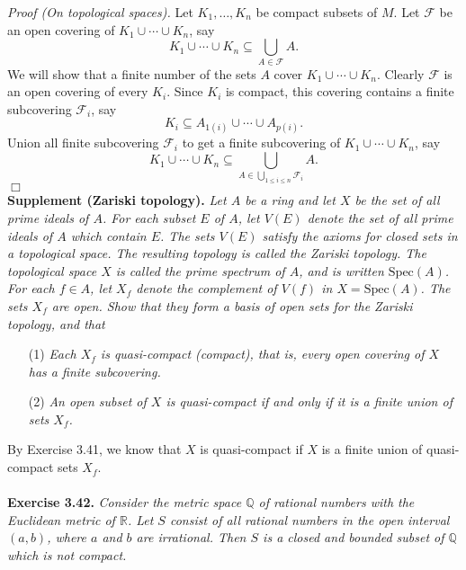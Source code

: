 \documentclass{article}
\begin{document}
\emph{Proof (On topological spaces).}
Let $K_1, \ldots, K_n$ be compact subsets of $M$.
Let $\mathscr{F}$ be an open covering of $K_1 \cup \cdots \cup K_n$, say
$$K_1 \cup \cdots \cup K_n \subseteq \bigcup_{A \in \mathscr{F}}A.$$
We will show that a finite number of the sets $A$ cover $K_1 \cup \cdots \cup K_n$.
Clearly $\mathscr{F}$ is an open covering of every $K_i$.
Since $K_i$ is compact, this covering contains a finite subcovering $\mathscr{F}_i$,
say
$$K_i \subseteq A_{1(i)} \cup \cdots \cup A_{p(i)}.$$
Union all finite subcovering $\mathscr{F}_i$ to get a finite subcovering of
$K_1 \cup \cdots \cup K_n$, say
$$K_1 \cup \cdots \cup K_n \subseteq
\bigcup_{A \in \bigcup_{1 \leq i \leq n} \mathscr{F}_i}A.$$
$\Box$ \\

\textbf{Supplement (Zariski topology).}
\emph{Let $A$ be a ring and let $X$ be the set of all prime ideals of $A$.
For each subset $E$ of $A$,
let $V(E)$ denote the set of all prime ideals of $A$ which contain $E$.
The sets $V(E)$ satisfy
the axioms for closed sets in a topological space.
The resulting topology is called the Zariski topology.
The topological space $X$ is called the prime spectrum of $A$,
and is written $\text{Spec}(A)$.} \\

\emph{For each $f \in A$,
let $X_f$ denote the complement of $V(f)$ in $X = \text{Spec}(A)$.
The sets $X_f$ are open.
Show that they form a basis of open sets for the Zariski topology, and that}
\begin{enumerate}
\item[(1)]
\emph{Each $X_f$ is quasi-compact (compact), that is,
every open covering of $X$ has a finite subcovering.}
\item[(2)]
\emph{An open subset of $X$ is quasi-compact if and only if
it is a finite union of sets $X_f$.} \\
\end{enumerate}

By Exercise 3.41, we know that $X$ is quasi-compact if
$X$ is a finite union of quasi-compact sets $X_f$. \\\\






\textbf{Exercise 3.42.}
\emph{Consider the metric space $\mathbb{Q}$ of rational numbers with
the Euclidean metric of $\mathbb{R}$.
Let $S$ consist of all rational numbers in the open interval $(a,b)$,
where $a$ and $b$ are irrational.
Then $S$ is a closed and bounded subset of $\mathbb{Q}$ which is not compact.} \\
\end{document}
